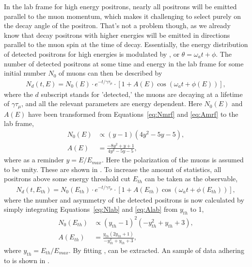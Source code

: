 In the lab frame for high energy positrons, nearly all positrons will be emitted parallel to the muon momentum, which makes it challenging to select purely on the decay angle of the positron. That's not a problem though, as we already know that decay positrons with higher energies will be emitted in directions parallel to the muon spin at the time of decay. Essentially, the energy distribution of detected positrons for high energies is modulated by \wa, or $\theta = \omega_{a}t + \phi$. The number of detected positrons at some time and energy in the lab frame for some initial number $N_{0}$ of muons can then be described by
        \begin{align}
            N_{d}(t, E) = N_{0}(E) \cdot e^{-t/\gamma\tau_{\mu}} \cdot [1 + A(E) \cos(\omega_{a}t+\phi(E))],
        \end{align}
where the $d$ subscript stands for 'detected,' the muons are decaying at a lifetime of $\gamma\tau_{\mu}$, and all the relevant parameters are energy dependent. Here $N_{0}(E)$ and $A(E)$ have been transformed from Equations~\ref{eq:Nmrf} and \ref{eq:Amrf} to the lab frame,
        \begin{align}
            N_{0}(E) &\propto (y-1)(4y^{2}-5y-5), \label{eq:Nlab} \\
            A(E) &= \frac{-8y^{2}+y+1}{4y^{2}-5y-5}, \label{eq:Alab}
        \end{align}
where as a reminder $y=E/E_{max}$. Here the polarization of the muons is assumed to be unity. These are shown in . To increase the amount of statistics, all positrons above some energy threshold cut $E_{th}$ can be taken as the observable,
        \begin{align} \label{eq:5parfunc}
            N_{d}(t, E_{th}) = N_{0}(E_{th}) \cdot e^{-t/\gamma\tau_{\mu}} \cdot [1 + A(E_{th}) \cos(\omega_{a}t+\phi(E_{th}))],
        \end{align}
where the number and asymmetry of the detected positrons is now calculated by simply integrating Equations~\ref{eq:Nlab} and \ref{eq:Alab} from $y_{th}$ to 1,
        \begin{align}
            N_{0}(E_{th}) &\propto (y_{th}-1)^{2}(-y_{th}^{2}+y_{th}+3), \label{eq:Nth} \\
            A(E_{th}) &= \frac{y_{th}(2y_{th}+1)}{-y_{th}^{2}+y_{th}+3}, \label{eq:Ath}
        \end{align}
where $y_{th}=E_{th}/E_{max}$. By fitting , \wa can be extracted. An sample of data adhering to  is shown in .



